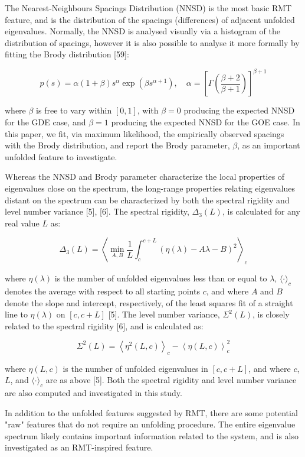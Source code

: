 The Nearest-Neighbours Spacings Distribution (NNSD) is the most basic RMT feature, and is the
distribution of the spacings (differences) of adjacent unfolded eigenvalues. Normally, the NNSD is
analysed visually via a histogram of the distribution of spacings, however it is also possible to
analyse it more formally by fitting the Brody distribution [59]:

\[
p(s) = \alpha (1 + \beta) s^\alpha \exp({\beta s^{\alpha+1}}),
\quad \alpha = \left[ \Gamma \left( \frac{\beta+2}{\beta+1} \right) \right]^{\beta+1}
\]

where \(\beta\) is free to vary within \([0, 1]\), with \(\beta = 0\)  producing the expected NNSD
for the GDE case, and \(\beta = 1\) producing the expected NNSD for the GOE case. In this paper, we
fit, via maximum likelihood, the empirically observed spacings with the Brody distribution, and
report the Brody parameter, \(\beta\), as an important unfolded feature to investigate.

Whereas the NNSD and Brody parameter characterize the local properties of eigenvalues close on the
spectrum, the long-range properties relating eigenvalues distant on the spectrum can be
characterized by both the spectral rigidity and level number variance [5], [6]. The spectral
rigidity, \(\Delta_3(L)\), is calculated for any real value \(L\) as:

\[
\Delta_3(L) = \left \langle \min_{A,B} \frac{1}{L} \int_c^{c+L} \left(  \eta(\lambda) -A \lambda - B \right)^2 \right \rangle_c
\]

where \(\eta(\lambda)\) is the number of unfolded eigenvalues less than or equal to \(\lambda\),
\(\langle \cdot \rangle_c\) denotes the average with respect to all starting points \(c\), and where
\(A\) and \(B\) denote the slope and intercept, respectively, of the least squares fit of a straight
line to \(\eta(\lambda)\) on \([c, c+L]\) [5]. The level number variance, \(\Sigma^2(L)\), is
closely related to the spectral rigidity [6], and is calculated as:

\[
\Sigma^2(L) = \left\langle \eta^2(L, c) \right\rangle_c - \left\langle \eta(L, c) \right\rangle^2_c
\]

where \(\eta(L, c)\) is the number of unfolded eigenvalues in \([c, c+ L]\), and where \(c\), \(L\),
and \(\langle \cdot \rangle_c\) are as above [5]. Both the spectral rigidity and level number
variance are also computed and investigated in this study.

In addition to the unfolded features suggested by RMT, there are some potential "raw" features that
do not require an unfolding procedure. The entire eigenvalue spectrum likely contains important
information related to the system, and is also investigated as an RMT-inspired feature.

